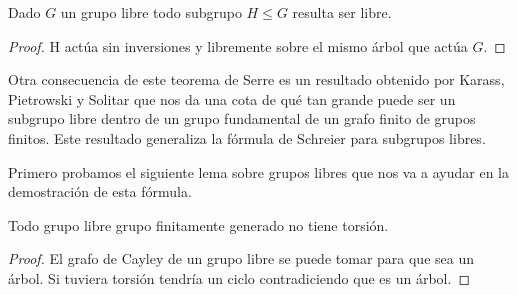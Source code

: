 \documentclass[tesis.tex]{subfiles}
\newcommand{\fg}{grupo finitamente generado }
\begin{document}
\begin{coro}\label{coro_niels_sch}
	Dado $G$ un grupo libre todo subgrupo $H \le G$ resulta ser libre.
\end{coro}
\begin{proof}
	H actúa sin inversiones y libremente sobre el mismo árbol que actúa $G$.
\end{proof}

Otra consecuencia de este teorema de Serre es un resultado obtenido por Karass, Pietrowski y Solitar que nos da una cota de qué tan grande puede ser un subgrupo libre dentro de un grupo fundamental de un grafo finito de grupos finitos.
Este resultado generaliza la fórmula de Schreier para subgrupos libres.


Primero probamos el siguiente lema sobre grupos libres que nos va a ayudar en la demostración de esta fórmula.

\begin{lema}\label{lema_libre_torsion}
	Todo grupo libre \fg no tiene torsión.
\end{lema}
\begin{proof}
	El grafo de Cayley de un grupo libre se puede tomar para que sea un árbol.
	Si tuviera torsión tendría un ciclo contradiciendo que es un árbol.
\end{proof}
\end{document}
